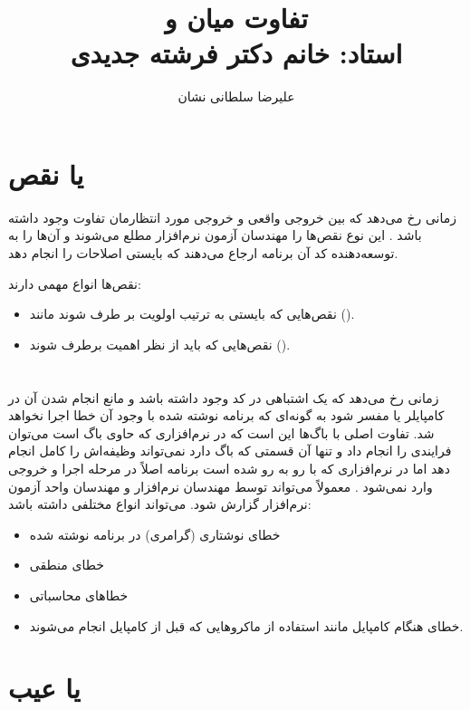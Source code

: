 \documentclass[10pt, a4paper]{article}
\title{تفاوت میان \lr{Failure} و \lr{Fault} \\ استاد: خانم دکتر فرشته جدیدی}
\author{علیرضا سلطانی نشان}
\begin{document}
\maketitle

\section{ یا نقص}

زمانی رخ می‌دهد که بین خروجی واقعی و خروجی مورد انتظارمان تفاوت وجود داشته باشد
\cite{jpoint}. این نوع نقص‌ها را مهندسان آزمون نرم‌افزار مطلع می‌شوند و آن‌ها را
به توسعه‌دهنده کد آن برنامه ارجاع می‌دهند که بایستی اصلاحات را انجام دهد.

نقص‌ها انواع مهمی دارند:

\begin{itemize}
    \item نقص‌هایی که بایستی به ترتیب اولویت بر طرف شوند مانند ().
    \item نقص‌هایی که باید از نظر اهمیت برطرف شوند ().
\end{itemize}

\section{}

 زمانی رخ می‌دهد که یک اشتباهی در کد وجود داشته باشد \cite{jpoint} و
مانع انجام شدن آن در کامپایلر یا مفسر شود به گونه‌ای که برنامه نوشته شده با وجود
آن خطا اجرا نخواهد شد. تفاوت اصلی  با باگ‌ها این است که در نرم‌افزاری
که حاوی باگ است می‌توان فرایندی را انجام داد و تنها آن قسمتی که باگ دارد
نمی‌تواند وظیفه‌اش را کامل انجام دهد اما در نرم‌افزاری که با  رو به رو
شده است برنامه اصلاً در مرحله اجرا و خروجی وارد نمی‌شود \cite{geekflare}.
معمولاً می‌تواند توسط مهندسان نرم‌افزار و مهندسان واحد آزمون نرم‌افزار گزارش
شود. می‌تواند انواع مختلفی داشته باشد:

\begin{itemize}
    \item خطای نوشتاری (گرامری) در برنامه نوشته شده
    \item خطای منطقی
    \item خطا‌های محاسباتی
    \item خطای هنگام کامپایل مانند استفاده از ماکرو‌هایی که قبل از کامپایل انجام
    می‌شوند.
\end{itemize}

\section{ یا عیب}
\end{document}
